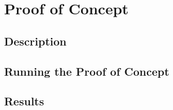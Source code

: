 \chapter{Proof of Concept}
    \section{Description}
    \section{Running the Proof of Concept}
    \section{Results}
